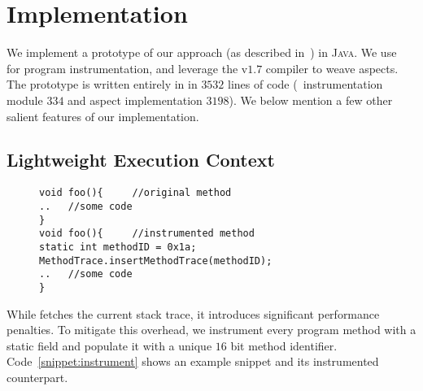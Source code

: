 \section{Implementation}
\label{sec:implementation}


We implement a prototype of our approach (as described in~) 
in \textsc{Java}. We use \soot~\cite{soot} for program instrumentation, 
and leverage the  v$1.7$ compiler to weave aspects. The prototype
is written entirely in \java in $3532$ lines of code (\soot\ instrumentation
module $334$ and aspect implementation $3198$). We below mention a few other
salient features of our implementation.


% 

\subsection{Lightweight Execution Context}
\label{subsec:trace}

 \begin{figure}[t]
\begin{lstlisting}
void foo(){		//original method
..   //some code
}
void foo(){		//instrumented method
static int methodID = 0x1a;
MethodTrace.insertMethodTrace(methodID);
..   //some code
}
\end{lstlisting}
\end{figure}

While  fetches the current stack trace, it introduces 
significant performance penalties. To mitigate this overhead, we instrument 
every program method with a static  field and populate it with a 
unique $16$ bit method identifier. Code~\ref{snippet:instrument} shows an 
example snippet and its instrumented counterpart.
% 
% 

